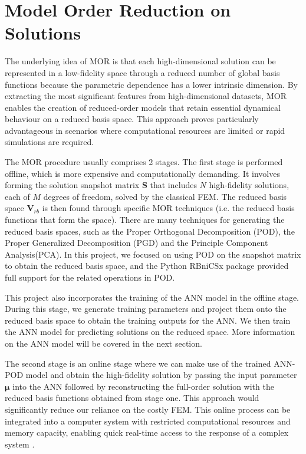 \section{Model Order Reduction on Solutions}
The underlying idea of MOR is that each high-dimensional solution can be represented in a low-fidelity space through a reduced number of global basis functions because the parametric dependence has a lower intrinsic dimension. By extracting the most significant features from high-dimensional datasets, MOR enables the creation of reduced-order models that retain essential dynamical behaviour on a reduced basis space. This approach proves particularly advantageous in scenarios where computational resources are limited or rapid simulations are required. 

The MOR procedure usually comprises 2 stages. The first stage is performed offline, which is more expensive and computationally demanding. It involves forming the solution snapshot matrix $\mathbf{S}$ that includes $N$ high-fidelity solutions, each of $M$ degrees of freedom, solved by the classical FEM. The reduced basis space $\mathbf{V}_{rb}$ is then found through specific MOR techniques (i.e. the reduced basis functions that form the space). There are many techniques for generating the reduced basis spaces, such as the Proper Orthogonal Decomposition (POD), the Proper Generalized Decomposition (PGD) and the Principle Component Analysis(PCA). In this project, we focused on using POD on the snapshot matrix to obtain the reduced basis space, and the Python RBniCSx package provided full support for the related operations in POD. 

This project also incorporates the training of the ANN model in the offline stage. During this stage, we generate training parameters and project them onto the reduced basis space to obtain the training outputs for the ANN. We then train the ANN model for predicting solutions on the reduced space. More information on the ANN model will be covered in the next section. 

The second stage is an online stage where we can make use of the trained ANN-POD model and obtain the high-fidelity solution by passing the input parameter $\bm{\mu}$ into the ANN followed by reconstructing the full-order solution with the reduced basis functions obtained from stage one. This approach would significantly reduce our reliance on the costly FEM. 
This online process can be integrated into a computer system with restricted computational resources and memory capacity, enabling quick real-time access to the response of a complex system \cite{hesthaven2015certified}. 

